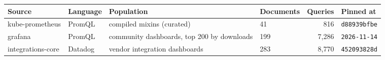 \begin{tabular}{@{}llllrl@{}}
\toprule
Source & Language & Population & Documents & Queries & Pinned at \\
\midrule
kube-prometheus & PromQL & compiled mixins (curated) & 41 & 816 & \texttt{d88939bfbe} \\
grafana & PromQL & community dashboards, top 200 by downloads & 199 & 7,286 & \texttt{2026-11-14} \\
integrations-core & Datadog & vendor integration dashboards & 283 & 8,770 & \texttt{452093828d} \\
\bottomrule
\end{tabular}
